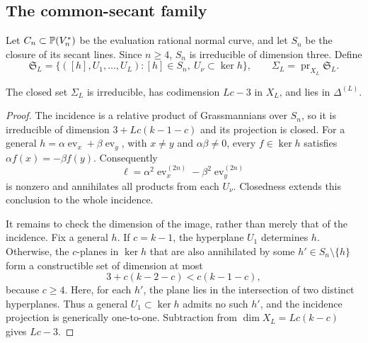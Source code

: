 \subsection{The common-secant family}
Let $C_n\subset\mathbb P(V_n^*)$ be the evaluation rational normal curve, and let $S_n$ be the closure of its secant lines. Since $n\ge4$, $S_n$ is irreducible of dimension three. Define
\begin{equation}\label{eq:secant-incidence}
 \mathfrak S_L=\{([h],U_1,\ldots,U_L):[h]\in S_n,
                                  \ U_\nu\subset\ker h\},
 \qquad \Sigma_L=\operatorname{pr}_{X_L}\mathfrak S_L.
\end{equation}
\begin{proposition}\label{prop:secant}
The closed set $\Sigma_L$ is irreducible, has codimension $Lc-3$ in $X_L$, and lies in $\Delta^{(L)}$.
\end{proposition}
\begin{proof}
The incidence is a relative product of Grassmannians over $S_n$, so it is irreducible of dimension $3+Lc(k-1-c)$ and its projection is closed. For a general $h=\alpha\operatorname{ev}_x+\beta\operatorname{ev}_y$, with $x\ne y$ and $\alpha\beta\ne0$, every $f\in\ker h$ satisfies $\alpha f(x)=-\beta f(y)$. Consequently
\[
 \ell=\alpha^2\operatorname{ev}_x^{(2n)}-
                     \beta^2\operatorname{ev}_y^{(2n)}
\]
is nonzero and annihilates all products from each $U_\nu$. Closedness extends this conclusion to the whole incidence.

It remains to check the dimension of the image, rather than merely that of the incidence. Fix a general $h$. If $c=k-1$, the hyperplane $U_1$ determines $h$. Otherwise, the $c$-planes in $\ker h$ that are also annihilated by some $h'\in S_n\setminus\{h\}$ form a constructible set of dimension at most
\[
 3+c(k-2-c)<c(k-1-c),
\]
because $c\ge4$. Here, for each $h'$, the plane lies in the intersection of two distinct hyperplanes. Thus a general $U_1\subset\ker h$ admits no such $h'$, and the incidence projection is generically one-to-one. Subtraction from $\dim X_L=Lc(k-c)$ gives $Lc-3$.
\end{proof}

